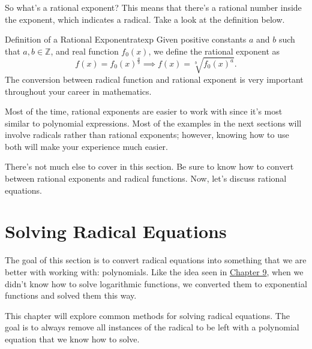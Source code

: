 \documentclass[../book.tex]{subfiles}
\begin{document}
So what's a rational exponent?  This means that there's a rational number inside the exponent, which indicates a radical.  Take a look at the definition below.

\begin{definition}{Definition of a Rational Exponent}{ratexp}
Given positive constants $a$ and $b$ such that $a,b\in\mathbb{Z}$, and real function $f_0(x)$, we define the rational exponent as $$f(x)=f_0(x)^{\frac{a}{b}} \implies f(x)=\sqrt[b]{f_0(x)^a}.$$ The conversion between radical function and rational exponent is very important throughout your career in mathematics.
\end{definition}
Most of the time, rational exponents are easier to work with since it's most similar to polynomial expressions. Most of the examples in the next sections will involve radicals rather than rational exponents; however, knowing how to use both will make your experience much easier.

There's not much else to cover in this section.  Be sure to know how to convert between rational exponents and radical functions.  Now, let's discuss rational equations.
\section{Solving Radical Equations}
\noindent The goal of this section is to convert radical equations into something that we are better with working with: polynomials.  Like the idea seen in \hyperlink{chapter.9}{Chapter 9}, when we didn't know how to solve logarithmic functions, we converted them to exponential functions and solved them this way.

This chapter will explore common methods for solving radical equations.  The goal is to always remove all instances of the radical to be left with a polynomial equation that we know how to solve.
\end{document}
